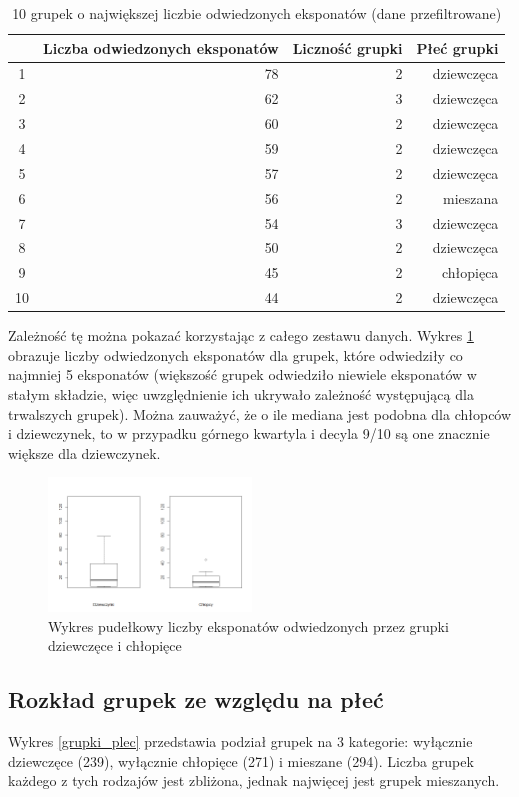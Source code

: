 \documentclass[conference]{IEEEtran}
\begin{document}
\begin{table}[H]
\caption{10 grupek o największej liczbie odwiedzonych eksponatów (dane przefiltrowane)}
\label{top_grupki2}
\centering
\begin{tabular}{|c|r|r|r|}
\hline
 & \textbf{Liczba odwiedzonych eksponatów} & \textbf{Liczność grupki}  & \textbf{Płeć grupki} \\
\hline
 1  & 78 & 2 & dziewczęca \\
 2  & 62 & 3 & dziewczęca \\
 3  & 60 & 2 & dziewczęca \\
 4  & 59 & 2 & dziewczęca \\
 5  & 57 & 2 & dziewczęca \\
 6  & 56 & 2 & mieszana  \\
 7  & 54 & 3 & dziewczęca \\
 8  & 50 & 2 & dziewczęca \\
 9  & 45 & 2 & chłopięca  \\
 10 & 44 & 2 & dziewczęca \\
\hline
\end{tabular}
\end{table}

Zależność tę można pokazać korzystając z całego zestawu danych. Wykres \ref{grupki_d_c_liczba_eksponatow} obrazuje liczby odwiedzonych eksponatów dla grupek, które odwiedziły co najmniej 5 eksponatów (większość grupek odwiedziło niewiele eksponatów w stałym składzie, więc uwzględnienie ich ukrywało zależność występującą dla trwalszych grupek). Można zauważyć, że o ile mediana jest podobna dla chłopców i dziewczynek, to w przypadku górnego kwartyla i decyla 9/10 są one znacznie większe dla dziewczynek.

\begin{figure}[H]
\includegraphics[width=0.48\textwidth]{grupki_d_c_liczba_eksponatow.png}
\caption{Wykres pudełkowy liczby eksponatów odwiedzonych przez grupki dziewczęce i chłopięce}
\label{grupki_d_c_liczba_eksponatow}
\end{figure}


\subsection{Rozkład grupek ze względu na płeć}
Wykres \ref{grupki_plec} przedstawia podział grupek na 3 kategorie: wyłącznie dziewczęce (239), wyłącznie chłopięce (271) i mieszane (294). Liczba grupek każdego z tych rodzajów jest zbliżona, jednak najwięcej jest grupek mieszanych.
\end{document}

